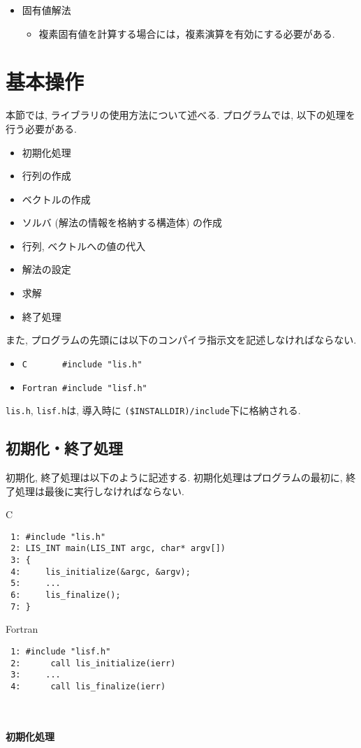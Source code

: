\documentclass[a4paper]{jarticle}
\begin{document}
{{\begin{itemize}
\item 固有値解法
\begin{itemize}
\item 複素固有値を計算する場合には，複素演算を有効にする必要がある. 
\end{itemize}

\end{itemize}
\vspace*{5mm}

\newpage
\section{基本操作}
本節では, ライブラリの使用方法について述べる. 
プログラムでは, 以下の処理を行う必要がある. 
\begin{itemize}
\item 初期化処理
\item 行列の作成
\item ベクトルの作成
\item ソルバ (解法の情報を格納する構造体) の作成
\item 行列, ベクトルへの値の代入
\item 解法の設定
\item 求解
\item 終了処理
\end{itemize}
また, プログラムの先頭には以下のコンパイラ指示文を記述しなければならない. 
\begin{itemize}
\item \verb+C       #include "lis.h"+
\item \verb+Fortran #include "lisf.h"+
\end{itemize}
{\tt lis.h}, {\tt lisf.h}は, 導入時に
\verb|($INSTALLDIR)/include|下に格納される. 

\subsection{初期化・終了処理}
初期化, 終了処理は以下のように記述する. 初期化処理はプログラムの最初に, 
終了処理は最後に実行しなければならない. 
\begin{itembox}[l]{C}
\small
\begin{verbatim}
 1: #include "lis.h"
 2: LIS_INT main(LIS_INT argc, char* argv[])
 3: {
 4:     lis_initialize(&argc, &argv);
 5:     ...
 6:     lis_finalize();
 7: }
\end{verbatim}
\end{itembox}
\begin{itembox}[l]{Fortran}
\small
\begin{verbatim}
 1: #include "lisf.h"
 2:      call lis_initialize(ierr) 
 3:     ...
 4:      call lis_finalize(ierr)
\end{verbatim}
\end{itembox}
\\ \\
\noindent
{\bf 初期化処理}

}}
\end{document}
